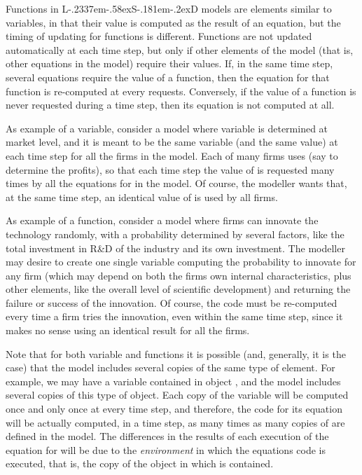 \documentclass [11pt,a4paper] {book}
\def\LsD{{L\kern-.2337em\lower-.58ex\hbox{S}\kern-.181em\lower-.2ex\hbox{D}}\xspace}
\begin{document}
Functions in \LsD models are elements similar to variables, in that their value is computed as the result of an equation, but the timing of updating for functions is different. Functions are not updated automatically at each time step, but only if other elements of the model (that is, other equations in the model) require their values. If, in the same time step, several equations require the value of a function, then the equation for that function is re-computed at every requests. Conversely, if the value of a function is never requested during a time step, then its equation is not computed at all.

As example of a variable, consider a model where variable  is determined at market level, and it is meant to be the same variable (and the same value) at each time step for all the firms in the model. Each of many firms uses  (say to determine the profits), so that
each time step the value of  is requested many times by all the equations for  in the model. Of course, the modeller wants that, at the same time step, an identical value of  is used by all
firms.

As example of a function, consider a model where firms can innovate the technology
randomly, with a probability determined by several factors, like the total investment in
R\&D of the industry and its own investment. The modeller may desire to create one
single variable computing the probability to innovate for any firm (which may depend on both the firms own internal characteristics, plus other elements, like the overall level of scientific development) and returning the
failure or success of the innovation. Of course, the code must be re-computed every time
a firm tries the innovation, even within the same time step, since it makes no sense
using an identical result for all the firms.

Note that for both variable and functions it is possible (and, generally, it is the case) that the model includes several copies of the same type of element. For example, we may have a variable  contained in object , and the model includes several copies of this type of object. Each copy of the variable  will be computed once and only once at every time step, and therefore, the code for its equation will be actually computed, in a time step, as many times as many copies of  are defined in the model. The differences in the results of each execution of the equation for  will be due to the \textit{environment} in which the equations code is executed, that is, the copy of the object in which  is contained.
\end{document}
